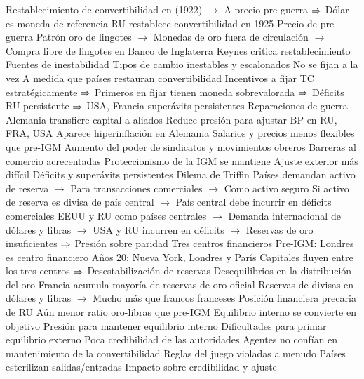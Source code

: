 \documentclass{nuevotema}
\begin{document}
\begin{esquemal}
				\4[] Restablecimiento de convertibilidad en (1922)
				\4[] $\to$ A precio pre-guerra
				\4[] $\Rightarrow$ Dólar es moneda de referencia
				\4 RU restablece convertibilidad en 1925
				\4[] Precio de pre-guerra
				\4[] Patrón oro de lingotes
				\4[] $\to$ Monedas de oro fuera de circulación
				\4[] $\to$ Compra libre de lingotes en Banco de Inglaterra
				\4[] Keynes critica restablecimiento
			\3 Fuentes de inestabilidad
				\4 Tipos de cambio inestables y escalonados
				\4[] No se fijan a la vez
				\4[] A medida que países restauran convertibilidad
				\4[] Incentivos a fijar TC estratégicamente
				\4[] $\Rightarrow$ Primeros en fijar tienen moneda sobrevalorada
				\4[] $\Rightarrow$ Déficits RU persistente
				\4[] $\Rightarrow$ USA, Francia superávits persistentes
				\4 Reparaciones de guerra
				\4[] Alemania transfiere capital a aliados
				\4[] Reduce presión para ajustar BP en RU, FRA, USA
				\4[] Aparece hiperinflación en Alemania
				\4 Salarios y precios menos flexibles que pre-IGM
				\4[] Aumento del poder de sindicatos y movimientos obreros
				\4 Barreras al comercio acrecentadas
				\4[] Proteccionismo de la IGM se mantiene
				\4[] Ajuste exterior más difícil
				\4[] Déficits y superávits persistentes
				\4 Dilema de Triffin
				\4[] Países demandan activo de reserva
				\4[] $\to$ Para transacciones comerciales
				\4[] $\to$ Como activo seguro
				\4[] Si activo de reserva es divisa de país central
				\4[] $\to$ País central debe incurrir en déficits comerciales
				\4[] EEUU y RU como países centrales
				\4[] $\to$ Demanda internacional de dólares y libras
				\4[] $\to$ USA y RU incurren en déficits
				\4[] $\to$ Reservas de oro insuficientes
				\4[] $\Rightarrow$ Presión sobre paridad
				\4 Tres centros financieros
				\4[] Pre-IGM: Londres es centro financiero
				\4[] Años 20: Nueva York, Londres y París
				\4[] Capitales fluyen entre los tres centros
				\4[] $\Rightarrow$ Desestabilización de reservas
				\4 Desequilibrios en la distribución del oro
				\4[] Francia acumula mayoría de reservas de oro oficial
				\4[] Reservas de divisas en dólares y libras
				\4[] $\to$ Mucho más que francos franceses
				\4 Posición financiera precaria de RU
				\4[] Aún menor ratio oro-libras que pre-IGM
				\4 Equilibrio interno se convierte en objetivo
				\4[] Presión para mantener equilibrio interno
				\4[] Dificultades para primar equilibrio externo
				\4 Poca credibilidad de las autoridades
				\4[] Agentes no confían en mantenimiento de la convertibilidad
				\4 Reglas del juego violadas a menudo
				\4[] Países esterilizan salidas/entradas
				\4[] Impacto sobre credibilidad y ajuste

\end{esquemal}
\end{document}
